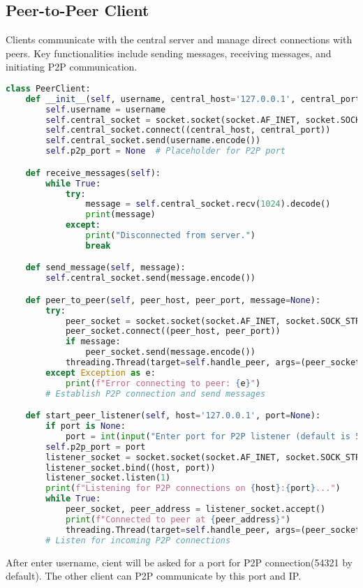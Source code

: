 \documentclass[12pt]{article}
\begin{document}
\subsection{Peer-to-Peer Client}
Clients communicate with the central server and manage direct connections with peers. Key functionalities include sending messages, receiving messages, and initiating P2P communication.
\begin{lstlisting}[language=Python, caption=Peer-to-Peer Client]
class PeerClient:
    def __init__(self, username, central_host='127.0.0.1', central_port=12345):
        self.username = username
        self.central_socket = socket.socket(socket.AF_INET, socket.SOCK_STREAM)
        self.central_socket.connect((central_host, central_port))
        self.central_socket.send(username.encode())
        self.p2p_port = None  # Placeholder for P2P port

    def receive_messages(self):
        while True:
            try:
                message = self.central_socket.recv(1024).decode()
                print(message)
            except:
                print("Disconnected from server.")
                break

    def send_message(self, message):
        self.central_socket.send(message.encode())

    def peer_to_peer(self, peer_host, peer_port, message=None):
        try:
            peer_socket = socket.socket(socket.AF_INET, socket.SOCK_STREAM)
            peer_socket.connect((peer_host, peer_port))
            if message:
                peer_socket.send(message.encode())
            threading.Thread(target=self.handle_peer, args=(peer_socket,)).start()
        except Exception as e:
            print(f"Error connecting to peer: {e}")
        # Establish P2P connection and send messages

    def start_peer_listener(self, host='127.0.0.1', port=None):
        if port is None:
            port = int(input("Enter port for P2P listener (default is 54321): ") or 54321)
        self.p2p_port = port
        listener_socket = socket.socket(socket.AF_INET, socket.SOCK_STREAM)
        listener_socket.bind((host, port))
        listener_socket.listen(1)
        print(f"Listening for P2P connections on {host}:{port}...")
        while True:
            peer_socket, peer_address = listener_socket.accept()
            print(f"Connected to peer at {peer_address}")
            threading.Thread(target=self.handle_peer, args=(peer_socket,)).start()
        # Listen for incoming P2P connections
\end{lstlisting}
After enter username, cient will be asked for a port for P2P connection(54321 by default). The other client can P2P communicate by this port and IP.
\end{document}

